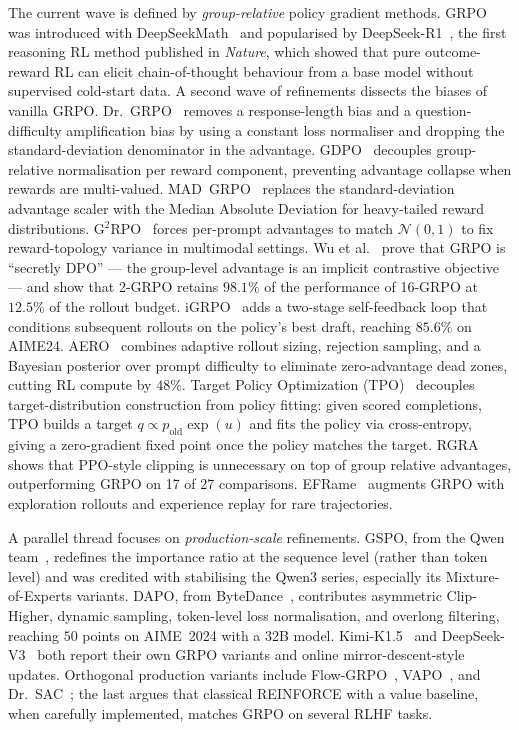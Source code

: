 The current wave is defined by \emph{group-relative} policy gradient methods.
GRPO was introduced with DeepSeekMath~\cite{shao2024deepseekmath} and
popularised by DeepSeek-R1~\cite{guo2025deepseekr1,guo2025deepseekr1nature}, the
first reasoning RL method published in \emph{Nature}, which showed that
pure outcome-reward RL can elicit chain-of-thought behaviour from a base
model without supervised cold-start data. A second wave of refinements
dissects the biases of vanilla GRPO. Dr.~GRPO~\cite{liu2025drgrpo} removes a
response-length bias and a question-difficulty amplification bias by using a
constant loss normaliser and dropping the standard-deviation denominator in the
advantage. GDPO~\cite{liu2026gdpo} decouples group-relative normalisation per
reward component, preventing advantage collapse when rewards are multi-valued.
MAD~GRPO~\cite{wang2025madgrpo} replaces the standard-deviation advantage
scaler with the Median Absolute Deviation for heavy-tailed reward
distributions. G$^{2}$RPO~\cite{hu2026openvlthinker} forces per-prompt
advantages to match $\mathcal{N}(0,1)$ to fix reward-topology variance in
multimodal settings. Wu et al.~\cite{wu2025grpo_dpo} prove that GRPO is
``secretly DPO'' --- the group-level advantage is an implicit contrastive
objective --- and show that 2-GRPO retains $98.1\%$ of the performance of
16-GRPO at $12.5\%$ of the rollout budget. iGRPO~\cite{hatamizadeh2026igrpo}
adds a two-stage self-feedback loop that conditions subsequent rollouts on the
policy's best draft, reaching $85.6\%$ on AIME24. AERO~\cite{zhang2026aero}
combines adaptive rollout sizing, rejection sampling, and a Bayesian posterior
over prompt difficulty to eliminate zero-advantage dead zones, cutting RL
compute by $48\%$. Target Policy Optimization (TPO)~\cite{kaddour2026tpo}
decouples target-distribution construction from policy fitting: given scored
completions, TPO builds a target $q \propto p_{\text{old}} \exp(u)$ and fits
the policy via cross-entropy, giving a zero-gradient fixed point once the
policy matches the target. RGRA~\cite{carrino2026rgra} shows that PPO-style
clipping is unnecessary on top of group relative advantages, outperforming
GRPO on 17 of 27 comparisons. EFRame~\cite{wang2025eframe} augments GRPO with
exploration rollouts and experience replay for rare trajectories.

A parallel thread focuses on \emph{production-scale} refinements. GSPO, from
the Qwen team~\cite{qwen2025gspo}, redefines the importance ratio at the
sequence level (rather than token level) and was credited with stabilising the
Qwen3 series, especially its Mixture-of-Experts variants. DAPO, from
ByteDance~\cite{yu2025dapo}, contributes asymmetric Clip-Higher, dynamic
sampling, token-level loss normalisation, and overlong filtering, reaching
$50$ points on AIME~2024 with a 32B model. Kimi-K1.5~\cite{team2025kimi15,
team2025kimik2} and DeepSeek-V3~\cite{deepseek2024v3} both report their own
GRPO variants and online mirror-descent-style updates. Orthogonal
production variants include
Flow-GRPO~\cite{liu2025flowgrpo}, VAPO~\cite{bytedance2025vapo}, and
Dr.~SAC~\cite{ahmadian2024backtobasics}; the last argues that classical
REINFORCE with a value baseline, when carefully implemented, matches GRPO on
several RLHF tasks.

